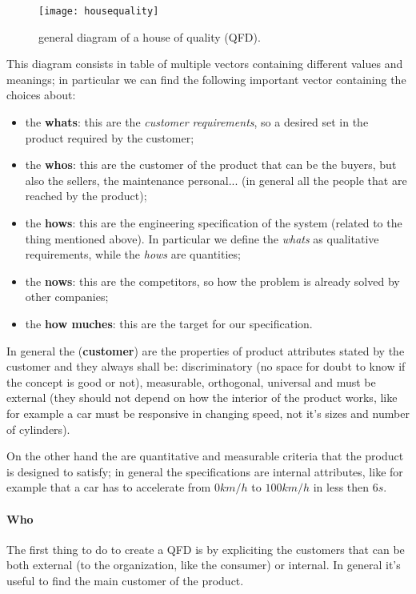 		\begin{figure}[bht]
			\centering \texttt{[image: housequality]}
			\caption{general diagram of a house of quality (QFD).}
			\label{fig:des:qfd}
		\end{figure}
		
		This diagram consists in table of multiple vectors containing different values and meanings; in particular we can find the following important vector containing the choices about:
		\begin{itemize}
			\item the \textbf{whats}: this are the \textit{customer requirements}, so a desired set in the product required by the customer;
			\item the \textbf{whos}: this are the customer of the product that can be the buyers, but also the sellers, the maintenance personal... (in general all the people that are reached by the product);
			\item the \textbf{hows}: this are the engineering specification of the system (related to the thing mentioned above). In particular we define the \textit{whats} as qualitative requirements, while the \textit{hows} are quantities;
			\item the \textbf{nows}: this are the competitors, so how the problem is already solved by other companies;
			\item the \textbf{how muches}: this are the target for our specification.
		\end{itemize}
		In general the (\textbf{customer})  are the properties of product attributes stated by the customer and they always shall be: discriminatory (no space for doubt to know if the concept is good or not), measurable, orthogonal, universal and must be external (they should not depend on how the interior of the product works, like for example a car must be responsive in changing speed, not it's sizes and number of cylinders).
		
		On the other hand the  are quantitative and measurable criteria that the product is designed to satisfy; in general the specifications are internal attributes, like for example that a car has to accelerate from $0 km/h$ to $100km/h$ in less then $6s$.
		
		\paragraph{Who} The first thing to do to create a QFD is by expliciting the customers that can be both external (to the organization, like the consumer) or internal. In general it's useful to find the main customer of the product.
		
